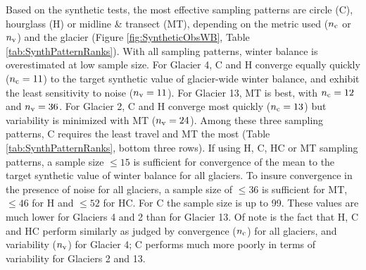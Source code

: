 \documentclass[twocolumn,letterpaper]{igs}
\begin{document}
Based on the synthetic tests, the most effective sampling patterns are circle (C), hourglass (H) or midline \& transect (MT), depending on the metric used ($n_{\rm c}$ or $n_{\rm v}$) and the glacier (Figure \ref{fig:SyntheticObsWB}, Table \ref{tab:SynthPatternRanks}). 
With all sampling patterns, winter balance is overestimated at low sample size.
For Glacier 4, C and H converge equally quickly ($n_{\rm c}=11$) to the target synthetic value of glacier-wide winter balance, and exhibit the least sensitivity to noise ($n_{\rm v}=11$). For Glacier 13, MT is best, with $n_{\rm c}=12$ and $n_{\rm v}=36$. For Glacier 2, C and H converge most quickly ($n_{\rm c}=13$) but variability is minimized with MT ($n_{\rm v}=24$). Among these three sampling patterns, C requires the least travel and MT the most (Table \ref{tab:SynthPatternRanks}, bottom three rows). 
If using H, C, HC or MT sampling patterns, a sample size $\leq 15$ is sufficient for convergence of the mean to the target synthetic value of winter balance for all glaciers. 
To insure convergence in the presence of noise for all glaciers, a sample size of  $\leq 36$ is sufficient for MT, $ \leq 46$ for H and $\leq 52$ for HC. For C the sample size is up to 99. These values are much lower for Glaciers 4 and 2 than for Glacier 13.   
Of note is the fact that H, C and HC perform similarly as judged by convergence ($n_{\rm c}$) for all glaciers, and variability ($n_{\rm v}$) for Glacier 4; C performs much more poorly in terms of variability for Glaciers 2 and 13.
\end{document}
